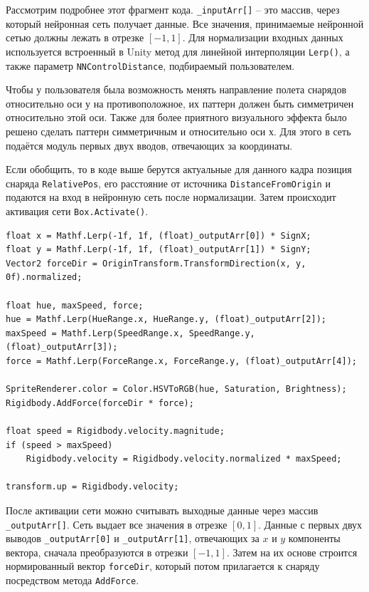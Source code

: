 Рассмотрим подробнее этот фрагмент кода. \lstinline{_inputArr[]} -- это массив, через который нейронная сеть получает данные. Все значения, принимаемые нейронной сетью должны лежать в отрезке $[-1,1]$. Для нормализации входных данных используется встроенный в Unity метод для линейной интерполяции \lstinline{Lerp()}, а также параметр \lstinline{NNControlDistance}, подбираемый пользователем.

Чтобы у пользователя была возможность менять направление полета снарядов относительно оси у на противоположное, их паттерн должен быть симметричен относительно этой оси. Также для более приятного визуального эффекта было решено сделать паттерн симметричным и относительно оси х. Для этого в сеть подаётся модуль первых двух вводов, отвечающих за координаты.

Если обобщить, то в коде выше берутся актуальные для данного кадра позиция снаряда \lstinline{RelativePos}, его расстояние от источника \lstinline{DistanceFromOrigin} и подаются на вход в нейронную сеть после нормализации. Затем происходит активация сети \lstinline{Box.Activate()}.



\pagebreak

\begin{lstlisting}[name=Projectile, caption={Projectile. Part 2}]
float x = Mathf.Lerp(-1f, 1f, (float)_outputArr[0]) * SignX;
float y = Mathf.Lerp(-1f, 1f, (float)_outputArr[1]) * SignY;    
Vector2 forceDir = OriginTransform.TransformDirection(x, y, 0f).normalized;
    
float hue, maxSpeed, force;
hue = Mathf.Lerp(HueRange.x, HueRange.y, (float)_outputArr[2]);
maxSpeed = Mathf.Lerp(SpeedRange.x, SpeedRange.y, (float)_outputArr[3]);
force = Mathf.Lerp(ForceRange.x, ForceRange.y, (float)_outputArr[4]);

SpriteRenderer.color = Color.HSVToRGB(hue, Saturation, Brightness);
Rigidbody.AddForce(forceDir * force);

float speed = Rigidbody.velocity.magnitude;
if (speed > maxSpeed)
    Rigidbody.velocity = Rigidbody.velocity.normalized * maxSpeed;

transform.up = Rigidbody.velocity;
\end{lstlisting}

После активации сети можно считывать выходные данные через массив \lstinline{_outputArr[]}. Сеть выдает все значения в отрезке $[0,1]$. Данные с первых двух выводов \lstinline{_outputArr[0]} и \lstinline{_outputArr[1]}, отвечающих за $x$ и $y$ компоненты вектора, сначала преобразуются в отрезки $[-1,1]$. Затем на их основе строится нормированный вектор \lstinline{forceDir}, который потом прилагается к снаряду посредством метода \lstinline{AddForce}.

